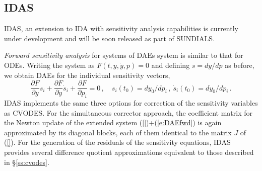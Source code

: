 
\subsection{IDAS}\label{ss:idas}

IDAS, an extension to IDA with sensitivity analysis capabilities is 
currently under development and will be soon released as part of SUNDIALS.

{\em Forward sensitivity analysis} for systems of DAEs system is similar to that 
for ODEs.  Writing the system as $F(t,y,\dot{y},p)=0$ and defining 
$s={dy}/{dp}$ as before, we obtain DAEs for the individual sensitivity vectors,
%
\begin{equation}\label{e:DAEfwd}
  \frac{\partial F}{\partial y} s_i + \frac{\partial F}{\partial \dot{y}} \dot{s}_i
  + \frac{\partial F}{\partial p_i}  = 0 \, , \quad
  s_i(t_0) = dy_0 / dp_i \, , ~ \dot{s}_i(t_0) = d\dot{y}_0 / dp_i \, .
\end{equation}
%
IDAS implements the same three options for correction of the sensitivity
variables as CVODES. For the simultaneous corrector approach, the coefficient
matrix for the Newton update of the extended system (\ref{})+(\ref{e:DAEfwd})
is again approximated by its diagonal blocks, each of them identical to the
matrix $J$ of (\ref{}). For the generation of the residuals of the sensitivity
equations, IDAS provides several difference quotient approximations equivalent 
to those described in \S\ref{ss:cvodes}.

